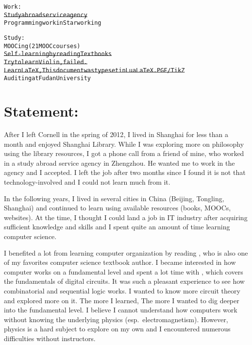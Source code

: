 


\usepackage[font={scriptsize,it}]{caption}
\usepackage{metalogo,alltt,soul,tikz,standalone,wrapfig,csquotes}
\usetikzlibrary{calc}
\usepackage{biblatex} %



\newcommand*{\onum}[1]{{\addfontfeatures{Numbers=OldStyle}#1}}
\newcommand*{\TikZ}{PGF/\kern1bpTi\kern.5bp\textit{k}Z}


	\begin{alltt}
		Work:
		\st{Study abroad service agency}
		Programming work in Starworking
		
		Study:
		MOOCing (21 MOOC courses)
		\st{Self-learning by reading Textbooks}
		\st{Try to learn Violin, failed.}
		\st{Learn LaTeX, This document was typeset in LuaLaTeX. PGF/TikZ}
		Auditing at Fudan University
	\end{alltt}
	
	\section*{Statement:}
	After I left Cornell in the spring of \onum{2012}, I lived in Shanghai for less than a month and enjoyed Shanghai Library. While I was exploring more on philosophy using the library resources, I got a phone call from a friend of mine, who worked in a study abroad service agency in Zhengzhou. He wanted me to work in the agency and I accepted. I left the job after two months since I found it is not that technology-involved and I could not learn much from it.
	
	In the following years, I lived in several cities in China (Beijing, Tongling, Shanghai) and continued to learn using available resources (books, MOOCs, websites). At the time, I thought I could land a job in IT industry after acquiring sufficient knowledge and skills and I spent quite an amount of time learning computer science.
	
	I benefited a lot from learning computer organization by reading \textcite{COA8e}, who is also one of my favorites computer science textbook author. I became interested in how computer works on a fundamental level and spent a lot time with \textcite{LCDF}, which covers the fundamentals of digital circuits. It was such a pleasant experience to see how combinatorial and sequential logic works. I wanted to know more circuit theory and explored more on it. The more I learned, The more I wanted to dig deeper into the fundamental level. I believe I cannot understand how computers work without knowing the underlying physics (esp.\ electromagnetism). However, physics is a hard subject to explore on my own and I encountered numerous difficulties without instructors.
	
